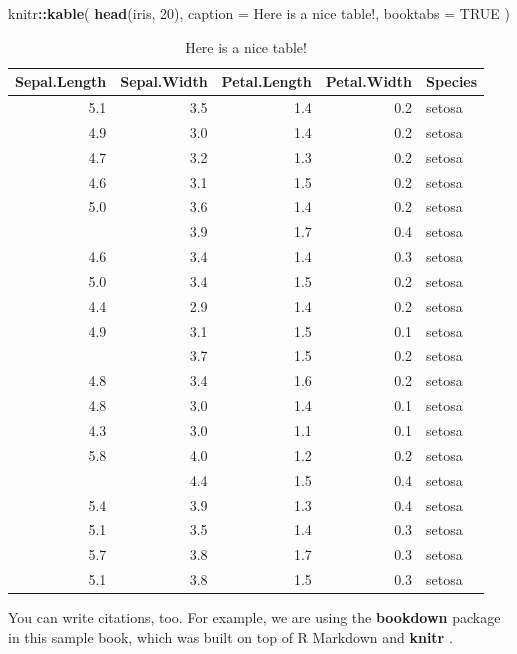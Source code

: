 \documentclass[
]{book}
\newenvironment{Shaded}{\begin{snugshade}}{\end{snugshade}}
\newcommand{\AttributeTok}[1]{\textcolor[rgb]{0.13,0.29,0.53}{#1}}
\newcommand{\ConstantTok}[1]{\textcolor[rgb]{0.56,0.35,0.01}{#1}}
\newcommand{\DecValTok}[1]{\textcolor[rgb]{0.00,0.00,0.81}{#1}}
\newcommand{\FunctionTok}[1]{\textcolor[rgb]{0.13,0.29,0.53}{\textbf{#1}}}
\newcommand{\NormalTok}[1]{#1}
\newcommand{\SpecialCharTok}[1]{\textcolor[rgb]{0.81,0.36,0.00}{\textbf{#1}}}
\newcommand{\StringTok}[1]{\textcolor[rgb]{0.31,0.60,0.02}{#1}}
\begin{document}
\begin{Shaded}
\begin{Highlighting}[]
\NormalTok{knitr}\SpecialCharTok{::}\FunctionTok{kable}\NormalTok{(}
  \FunctionTok{head}\NormalTok{(iris, }\DecValTok{20}\NormalTok{), }\AttributeTok{caption =} \StringTok{\textquotesingle{}Here is a nice table!\textquotesingle{}}\NormalTok{,}
  \AttributeTok{booktabs =} \ConstantTok{TRUE}
\NormalTok{)}
\end{Highlighting}
\end{Shaded}

\begin{table}

\caption{\label{tab:nice-tab}Here is a nice table!}
\centering
\begin{tabular}[t]{rrrrl}
\toprule
Sepal.Length & Sepal.Width & Petal.Length & Petal.Width & Species\\
\midrule
5.1 & 3.5 & 1.4 & 0.2 & setosa\\
4.9 & 3.0 & 1.4 & 0.2 & setosa\\
4.7 & 3.2 & 1.3 & 0.2 & setosa\\
4.6 & 3.1 & 1.5 & 0.2 & setosa\\
5.0 & 3.6 & 1.4 & 0.2 & setosa\\
\addlinespace
5.4 & 3.9 & 1.7 & 0.4 & setosa\\
4.6 & 3.4 & 1.4 & 0.3 & setosa\\
5.0 & 3.4 & 1.5 & 0.2 & setosa\\
4.4 & 2.9 & 1.4 & 0.2 & setosa\\
4.9 & 3.1 & 1.5 & 0.1 & setosa\\
\addlinespace
5.4 & 3.7 & 1.5 & 0.2 & setosa\\
4.8 & 3.4 & 1.6 & 0.2 & setosa\\
4.8 & 3.0 & 1.4 & 0.1 & setosa\\
4.3 & 3.0 & 1.1 & 0.1 & setosa\\
5.8 & 4.0 & 1.2 & 0.2 & setosa\\
\addlinespace
5.7 & 4.4 & 1.5 & 0.4 & setosa\\
5.4 & 3.9 & 1.3 & 0.4 & setosa\\
5.1 & 3.5 & 1.4 & 0.3 & setosa\\
5.7 & 3.8 & 1.7 & 0.3 & setosa\\
5.1 & 3.8 & 1.5 & 0.3 & setosa\\
\bottomrule
\end{tabular}
\end{table}

You can write citations, too. For example, we are using the \textbf{bookdown} package \citep{R-bookdown} in this sample book, which was built on top of R Markdown and \textbf{knitr} \citep{xie2015}.
\end{document}
